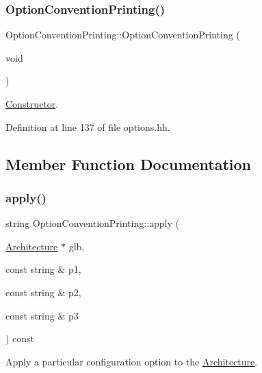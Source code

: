 \subsubsection{\texorpdfstring{OptionConventionPrinting()}{OptionConventionPrinting()}}
{\footnotesize\ttfamily Option\+Convention\+Printing\+::\+Option\+Convention\+Printing (\begin{DoxyParamCaption}\item[{void}]{ }\end{DoxyParamCaption})\hspace{0.3cm}{\ttfamily [inline]}}



\mbox{\hyperlink{class_constructor}{Constructor}}. 



Definition at line 137 of file options.\+hh.



\subsection{Member Function Documentation}
\mbox{\label{class_option_convention_printing_a9f28fa77231c615d59e6357fece32f7d}} 
\subsubsection{\texorpdfstring{apply()}{apply()}}
{\footnotesize\ttfamily string Option\+Convention\+Printing\+::apply (\begin{DoxyParamCaption}\item[{\mbox{\hyperlink{class_architecture}{Architecture}} $\ast$}]{glb,  }\item[{const string \&}]{p1,  }\item[{const string \&}]{p2,  }\item[{const string \&}]{p3 }\end{DoxyParamCaption}) const\hspace{0.3cm}{\ttfamily [virtual]}}



Apply a particular configuration option to the \mbox{\hyperlink{class_architecture}{Architecture}}. 

